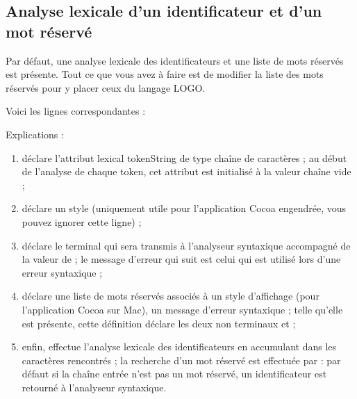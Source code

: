 \subsection{Analyse lexicale d'un identificateur et d'un mot réservé}

Par défaut, une analyse lexicale des identificateurs et une liste de mots réservés est présente. Tout ce que vous avez à faire est de modifier la liste des mots réservés pour y placer ceux du langage LOGO.

Voici les lignes correspondantes :


Explications :
\begin{enumerate}
  \item {} déclare l’attribut lexical tokenString de type chaîne de caractères ; au début de l’analyse de chaque token, cet attribut est initialisé à la valeur chaîne vide ;
  \item {} déclare un style (uniquement utile pour l’application Cocoa engendrée, vous pouvez ignorer cette ligne) ;
  \item {} déclare le terminal  qui sera transmis à l’analyseur syntaxique accompagné de la valeur de  ; le message d’erreur qui suit est celui qui est utilisé lors d’une erreur syntaxique ;
  \item {} déclare une liste de mots réservés associés à un style d’affichage (pour l’application Cocoa sur Mac), un message d’erreur syntaxique ; telle qu’elle est présente, cette définition déclare les deux non terminaux  et  ;
  \item enfin,  effectue l’analyse lexicale des identificateurs en accumulant dans  les caractères rencontrés ; la recherche d'un mot réservé est effectuée par : par défaut si la chaîne entrée n'est pas un mot réservé, un identificateur est retourné à l’analyseur syntaxique.
\end{enumerate}

